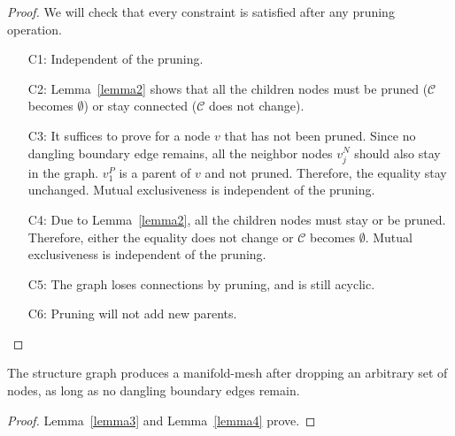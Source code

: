 \begin{proof}
 We will check that every constraint is satisfied after any pruning
 operation.
\begin{enumerate}[itemsep=0mm]
 \item[C1:] Independent of the pruning.
 \item[C2:] Lemma~\ref{lemma2} shows that all the children nodes must be pruned
 ($\mathcal{C}$ becomes $\emptyset$) or stay connected ($\mathcal{C}$
 does not change).
 \item[C3:] It suffices to prove for a node $v$ that has not been
            pruned. Since
            no dangling boundary edge remains, all the neighbor nodes $v^N_j$
            should also stay in the graph. $v^P_1$ is a parent of $v$ and not
            pruned. Therefore, the equality stay unchanged.
            Mutual exclusiveness is independent of the pruning.
 \item[C4:] Due to Lemma~\ref{lemma2}, all the children nodes must stay or be
            pruned. Therefore, either the equality does not change or
            $\mathcal{C}$ becomes $\emptyset$.
            Mutual exclusiveness is independent of the pruning.
 \item[C5:] The graph loses connections by pruning, and is still acyclic.
 \item[C6:] Pruning will not add new parents.
\end{enumerate}
\end{proof}

\begin{theorem}
 The structure graph produces a manifold-mesh after dropping an
 arbitrary set of nodes, as long as no dangling boundary edges remain.
\end{theorem}

\begin{proof}
 Lemma~\ref{lemma3} and Lemma~\ref{lemma4} prove.
\end{proof}
 

